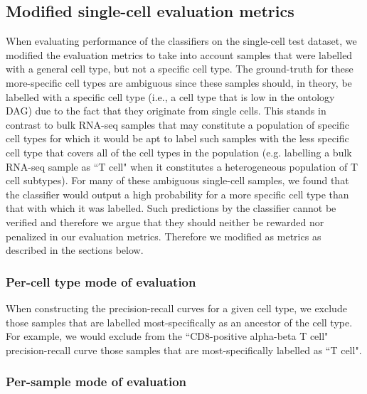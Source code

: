 \subsection{Modified single-cell evaluation metrics}

When evaluating performance of the classifiers on the single-cell test dataset, we modified the evaluation metrics to take into account samples that were labelled with a general cell type, but not a specific cell type. The ground-truth for these more-specific cell types are ambiguous since these samples should, in theory, be labelled with a specific cell type (i.e., a cell type that is low in the ontology DAG) due to the fact that they originate from single cells.  This stands in contrast to bulk RNA-seq samples that may constitute a population of specific cell types for which it would be apt to label such samples with the less specific cell type that covers all of the cell types in the population (e.g. labelling a bulk RNA-seq sample as ``T cell" when it constitutes a heterogeneous population of T cell subtypes).  For many of these ambiguous single-cell samples, we found that the classifier would output a high probability for a more specific cell type than that with which it was labelled. Such predictions by the classifier cannot be verified and therefore we argue that they should neither be rewarded nor penalized in our evaluation metrics. Therefore we modified as metrics as described in the sections below.

\subsubsection{Per-cell type mode of evaluation}

When constructing the precision-recall curves for a given cell type, we exclude those samples that are labelled most-specifically as an ancestor of the cell type. For example, we would exclude from the ``CD8-positive alpha-beta T cell" precision-recall curve those samples that are most-specifically labelled as ``T cell". 

\subsubsection{Per-sample mode of evaluation}

